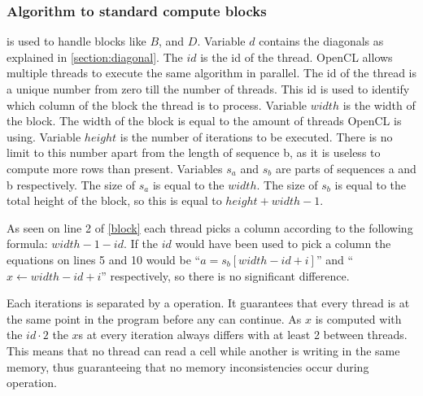 \subsubsection{Algorithm to standard compute blocks}
 is used to handle blocks like $B$, and $D$.
Variable $d$ contains the diagonals as explained in \cref{section:diagonal}.
The $id$ is the id of the thread.
OpenCL allows multiple threads to execute the same algorithm in parallel.
The id of the thread is a unique number from zero till the number of threads.
This id is used to identify which column of the block the thread is to process.
Variable $width$ is the width of the block.
The width of the block is equal to the amount of threads OpenCL is using.
Variable $height$ is the number of iterations to be executed.
There is no limit to this number apart from the length of sequence b, as it is useless to compute more rows than present.
Variables $s_a$ and $s_b$ are parts of sequences a and b respectively.
The size of $s_a$ is equal to the $width$.
The size of $s_b$ is equal to the total height of the block, so this is equal to $height + width - 1$.

As seen on line 2 of \cref{block} each thread picks a column according to the following formula: $width - 1 - id$.
If the $id$ would have been used to pick a column the equations on lines 5 and 10 would be ``$a = s_b[width - id + i]$'' and ``$x \gets width - id + i$'' respectively, so there is no significant difference.

Each iterations is separated by a  operation.
It guarantees that every thread is at the same point in the program before any can continue.
As $x$ is computed with the $id \cdot 2$ the $x$s at every iteration always differs with at least 2 between threads.
This means that no thread can read a cell while another is writing in the same memory, thus guaranteeing that no memory inconsistencies occur during operation.

